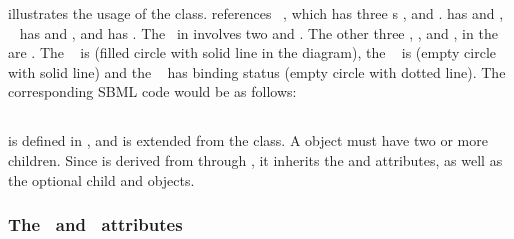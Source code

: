  illustrates the usage of the \OutwardBindingSite class.   references \speciesType\ , which has three \speciesTypeInstance s ,  and .   has   and ,  \speciesTypeInstance\  has   and , and   has  . The \inSpeciesTypeBond\ in  involves two   and . The other three , ,  and , in the \species\  are \outwardBindingSites. The \outwardBindingSite\  is  (filled circle with solid line in the diagram), the \outwardBindingSite\  is  (empty circle with solid line) and the \outwardBindingSite\  has binding status  (empty circle with dotted line). The corresponding SBML code would be as follows:



\subsection{}
\label{def:SubListOfSpeciesFeatures}

 is defined in , and is extended from the  class.  \mBlockChangedBegin{\revTwentyTwentyMarch}A  object\mBlockChangedEnd{\revTwentyTwentyMarch} must have \mBlockChangedBegin{\revTwentyTwentyMarch}  two or\mBlockChangedEnd{\revTwentyTwentyMarch} more \SpeciesFeature children. Since  is derived from  through , it inherits the  and  attributes, as well as the optional \mBlockChangedBegin{\revTwentyTwentyMarch}child\mBlockChangedEnd{\revTwentyTwentyMarch}  and  objects. 

\subsubsection{The \idAtt\ and \nameAtt\ attributes}
\label{def:SubListOfSpeciesFeatures:id}

